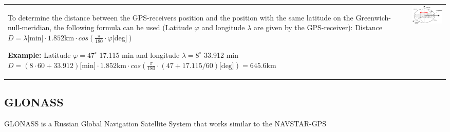 	\begin{tabular}{ll}
		\parbox{11cm}{
			To determine the distance between the GPS-receivers position and the position with the same 
			latitude on the Greenwich-null-meridian, the following formula can be used 
			(Latitude $\varphi$ and longitude $\lambda$ are given by the GPS-receiver):\\
			Distance $D = \lambda \text{[min]} \cdot 1.852 \text{km} \cdot cos(\frac{\pi}{180}\cdot \varphi \text{[deg]}) $ \\
			
			\textbf{Example:}
			Latitude $\varphi = 47^\circ$ 17.115 min and longitude $\lambda = 8^\circ$ 33.912 min \\
			$D = (8\cdot 60 + 33.912) \text{[min]} \cdot 1.852 \text{km} \cdot cos(\frac{\pi}{180}\cdot (47 + 17.115/60) \text{[deg]}) = 645.6$km
		}	
		& \parbox{7cm}{
			\includegraphics[width=7cm]{./bilder/gps-distance.png}\\ 
		}
	\end{tabular}


\subsection{GLONASS}
	GLONASS is a Russian Global Navigation Satellite System that works similar to the NAVSTAR-GPS
